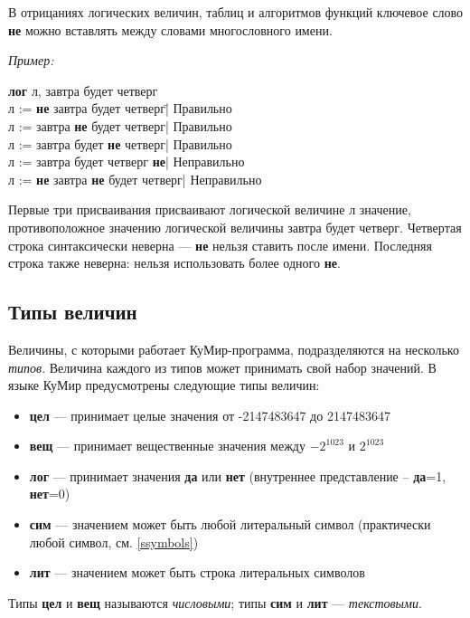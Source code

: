 \documentclass[12pt,a4paper]{article}
\begin{document}
	В отрицаниях логических величин, таблиц и алгоритмов функций ключевое слово \textbf{не} можно вставлять между словами многословного имени.

\emph{Пример:}
{\sffamily\begin{tabbing}
\textbf{лог} л, завтра будет четверг\\
л := \textbf{не} завтра будет четверг\qquad\=| Правильно\\
л := завтра \textbf{не} будет четверг\>| Правильно\\
л := завтра будет \textbf{не} четверг\>| Правильно\\
л := завтра будет четверг \textbf{не}\>| Неправильно\\
л := \textbf{не} завтра \textbf{не} будет четверг\>| Неправильно
\end{tabbing}
}

Первые три присваивания присваивают логической величине \textsf{л} значение, противоположное значению логической величины \textsf{завтра будет четверг}.
Четвертая строка синтаксически неверна --- \textbf{не} нельзя ставить после имени. Последняя строка также неверна: нельзя использовать более одного \textbf{не}.

\subsection{Типы величин}
\label{types}

Величины, с которыми работает КуМир-программа, подразделяются на несколько \emph{\mbox{типов}}. Величина каждого из типов может принимать свой набор значений. В языке КуМир предусмотрены следующие типы величин:
\begin{itemize}
\item  \textbf{цел}  --- принимает целые значения от -2147483647 до 2147483647
\item  \textbf{вещ} --- принимает вещественные значения между $-2^{1023}$ и $2^{1023}$
\item  \textbf{лог}  --- принимает значения \textbf{да} или \textbf{нет} (внутреннее представление -- \textbf{да}=1, \textbf{нет}=0)
\item  \textbf{сим}  --- значением может быть любой литеральный символ (практически любой
             символ, см. \ref{ssymbols})
\item  \textbf{лит}  --- значением может быть строка литеральных символов
\end{itemize}

	Типы \textbf{цел} и \textbf{вещ} называются \emph{числовыми}; типы \textbf{сим} и \textbf{лит} --- \emph{текстовыми}.
\end{document}
